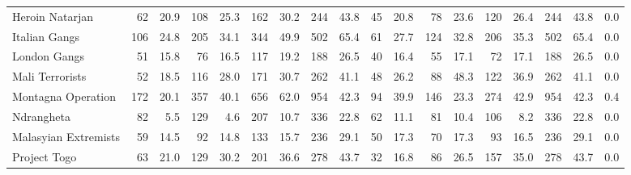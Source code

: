 \begin{tabular}{lrrrrrrrrrrrrrrrrl}
Heroin Natarjan      &                62 &  20.9 &  108 &  25.3 &  162 &  30.2 &  244 &  43.8 &               45 &   20.8 &   78 &   23.6 &  120 &   26.4 &  244 &  43.8 &        0.0 \\
Italian Gangs        &               106 &  24.8 &  205 &  34.1 &  344 &  49.9 &  502 &  65.4 &               61 &   27.7 &  124 &   32.8 &  206 &   35.3 &  502 &  65.4 &        0.0 \\
London Gangs         &                51 &  15.8 &   76 &  16.5 &  117 &  19.2 &  188 &  26.5 &               40 &   16.4 &   55 &   17.1 &   72 &   17.1 &  188 &  26.5 &        0.0 \\
Mali Terrorists      &                52 &  18.5 &  116 &  28.0 &  171 &  30.7 &  262 &  41.1 &               48 &   26.2 &   88 &   48.3 &  122 &   36.9 &  262 &  41.1 &        0.0 \\
Montagna Operation   &               172 &  20.1 &  357 &  40.1 &  656 &  62.0 &  954 &  42.3 &               94 &   39.9 &  146 &   23.3 &  274 &   42.9 &  954 &  42.3 &        0.4 \\
Ndrangheta           &                82 &   5.5 &  129 &   4.6 &  207 &  10.7 &  336 &  22.8 &               62 &   11.1 &   81 &   10.4 &  106 &    8.2 &  336 &  22.8 &        0.0 \\
Malasyian Extremists &                59 &  14.5 &   92 &  14.8 &  133 &  15.7 &  236 &  29.1 &               50 &   17.3 &   70 &   17.3 &   93 &   16.5 &  236 &  29.1 &        0.0 \\
Project Togo         &                63 &  21.0 &  129 &  30.2 &  201 &  36.6 &  278 &  43.7 &               32 &   16.8 &   86 &   26.5 &  157 &   35.0 &  278 &  43.7 &        0.0 \\
\bottomrule
\end{tabular}
